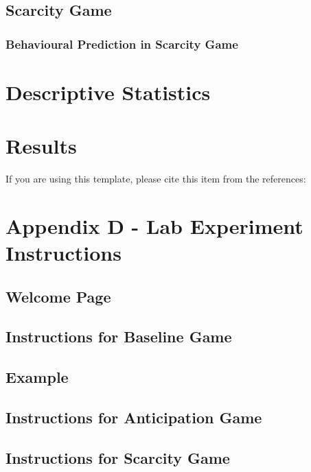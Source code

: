 \documentclass[11pt, a4paper, leqno]{article}
\begin{document}
    \subsection{Scarcity Game}\label{main:section34a}
    

        \subsubsection{Behavioural Prediction in Scarcity Game}\label{main:section34b}
        

\section{Descriptive Statistics}\label{main:section41}

\section{Results}\label{main:section42}

If you are using this template, please cite this item from the references:





\printbibliography
{}


 \appendix
 \section{Appendix D - Lab Experiment Instructions}\label{app:A}
 \vspace{15pt}
 \subsection{Welcome Page}
 

     \subsection{Instructions for Baseline Game}
     

     \subsection{Example}
     

     \subsection{Instructions for Anticipation Game}
     

     \subsection{Instructions for Scarcity Game}
     

\end{document}
